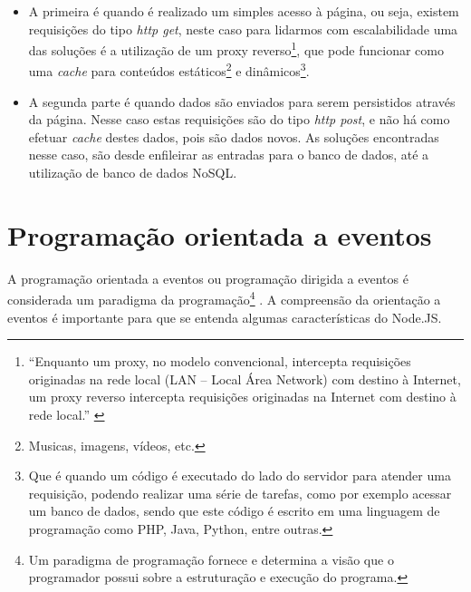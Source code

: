 \begin{description}
\begin{itemize}
  \item A primeira é quando é realizado um simples acesso à página, ou seja, existem requisições do tipo \textit{http get}, neste caso para lidarmos com escalabilidade uma das soluções é a utilização de um proxy reverso\footnote{``Enquanto um proxy, no modelo convencional, intercepta requisições originadas na rede local (LAN – Local Área Network) com destino à Internet, um proxy reverso intercepta requisições originadas na Internet com destino à rede local.'' \cite{proxyRev}}, que pode funcionar como uma \textit{cache} para conteúdos estáticos\footnote{Musicas, imagens, vídeos, etc.} e dinâmicos\footnote{Que é quando um código é executado do lado do servidor para atender uma requisição, podendo realizar uma série de tarefas, como por exemplo acessar um banco de dados, sendo que este código é escrito em uma linguagem de programação como PHP, Java, Python, entre outras.}.

 \item A segunda parte é quando dados são enviados para serem persistidos através da página. Nesse caso estas requisições são do tipo \textit{http post}, e não há como efetuar \textit{cache} destes dados, pois são dados novos. As soluções encontradas nesse caso, são desde enfileirar as entradas para o banco de dados, até a utilização de banco de dados NoSQL.
\end{itemize}

\end{description}

\section{Programação orientada a eventos}
\label{sec:Programação orientada a eventos}
\nocite{eventDrivenPro}
A programação orientada a eventos ou programação dirigida a eventos é considerada um paradigma da programação\footnote{Um paradigma de programação fornece e determina a visão que o programador possui sobre a estruturação e execução do programa.} . A compreensão da orientação a eventos é importante para que se entenda algumas características do Node.JS. 


